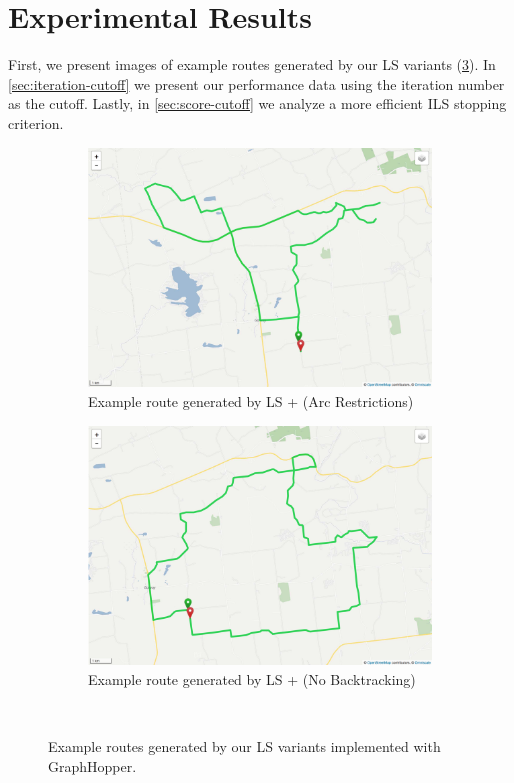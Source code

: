 \documentclass[honors]{union-cs-thesis}
\begin{document}
\section{Experimental Results}
First, we present images of example routes generated by our LS variants (\cref{fig:ls-route-variants}). In \cref{sec:iteration-cutoff} we present our performance data using the iteration number as the cutoff. Lastly, in \cref{sec:score-cutoff} we analyze a more efficient ILS stopping criterion.  

\begin{figure}
\begin{subfigure}{.48\linewidth}
\centering
\includegraphics[width=\textwidth]{figs/ls-route-mins}
\caption{Example route generated by LS + (Arc Restrictions)}
\label{fig:ls-arc-restrictions}
\end{subfigure}%
\hfill
\begin{subfigure}{.48\linewidth}
\centering
\includegraphics[width=\textwidth]{figs/ls-route-no-backtracking}
\caption{Example route generated by LS + (No Backtracking)}
\label{fig:ls-no-backtracking}
\end{subfigure}\\[1ex]
\caption{Example routes generated by our LS variants implemented with GraphHopper.}
\label{fig:ls-route-variants}
\end{figure}
\end{document}
